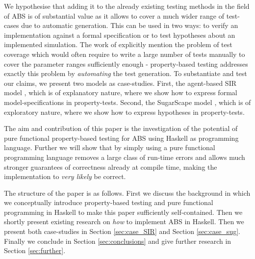 We hypothesise that adding it to the already existing testing methods in the field of ABS is of substantial value as it allows to cover a much wider range of test-cases due to automatic generation. This can be used in two ways: to verify an implementation against a formal specification or to test hypotheses about an implemented simulation. The work of \cite{onggo_test-driven_2016} explicitly mention the problem of test coverage which would often require to write a large number of tests manually to cover the parameter ranges sufficiently enough - property-based testing addresses exactly this problem by \textit{automating} the test generation.
To substantiate and test our claims, we present two models as case-studies. First, the agent-based SIR model \cite{macal_agent-based_2010}, which is of explanatory nature, where we show how to express formal model-specifications in property-tests. Second, the SugarScape model \cite{epstein_growing_1996}, which is of exploratory nature, where we show how to express hypotheses in property-tests. 

The aim and contribution of this paper is the investigation of the potential of pure functional property-based testing for ABS using Haskell as programming language. Further we will show that by simply using a pure functional programming language removes a large class of run-time errors and allows much stronger guarantees of correctness already at compile time, making the implementation to \textit{very likely} be correct.

The structure of the paper is as follows. First we discuss the background in which we conceptually introduce property-based testing and pure functional programming in Haskell to make this paper sufficiently self-contained. Then we shortly present existing research on \textit{how} to implement ABS in Haskell. Then we present both case-studies in Section \ref{sec:case_SIR} and Section \ref{sec:case_sug}. Finally we conclude in Section \ref{sec:conclusions} and give further research in Section \ref{sec:further}. 